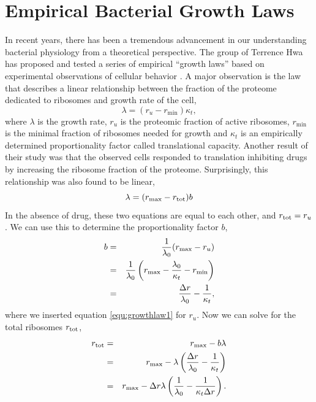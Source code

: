 \section{Empirical Bacterial Growth Laws}
\label{sec:emp_laws}

In recent years, there has been a tremendous advancement in our understanding
bacterial physiology from a theoretical perspective. The group of
Terrence Hwa has proposed and tested a series of empirical ``growth laws'' based on experimental observations of cellular behavior \cite{Scott2010,Deris2013}. A major observation is the law that describes a linear relationship between the fraction of the proteome dedicated to ribosomes and growth rate of the cell,
\begin{equation}
    \lambda = (r_u - r_\mathrm{min})\kappa_t\label{equ:growthlaw1},
\end{equation}
where $\lambda$ is the growth rate, $r_u$ is the proteomic fraction of active ribosomes, $r_\mathrm{min}$ is the minimal fraction of ribosomes needed for growth and $\kappa_t$ is an empirically determined proportionality factor called translational capacity. Another result of their study was that the observed cells responded to translation inhibiting drugs by increasing the ribosome fraction of the proteome. Surprisingly, this relationship was also found to be linear,
\begin{equation}
    \lambda = (r_\mathrm{max} - r_{\mathrm{tot}}) b\label{equ:growthlaw2}
\end{equation}
In the absence of drug, these two equations are equal to each other, and $r_{\mathrm{tot}} = r_u$. We can use this to determine the proportionality factor $b$,
\begin{eqnarray}
    b&=&\frac{1}{\lambda_0}(r_{\mathrm{max}}-r_u) \nonumber\\
    &=&\frac{1}{\lambda_0}\left(r_{\mathrm{max}}-\frac{\lambda_0}{\kappa_t}-r_{\mathrm{min}}\right)\nonumber \\
    &=&\frac{\Delta r}{\lambda_0} - \frac{1}{\kappa_t},
\end{eqnarray}
where we inserted equation \ref{equ:growthlaw1} for $r_u$. Now we can solve for the total ribosomes $r_{\mathrm{tot}}$,
\begin{eqnarray}
    r_{\mathrm{tot}} &=& r_{\mathrm{max}} - b\lambda \nonumber\\
    &=&r_{\mathrm{max}} - \lambda \left(\frac{\Delta r}{\lambda_0} - \frac{1}{\kappa_t}\right) \nonumber\\
    &=& r_{\mathrm{max}} - \Delta r\lambda \left( \frac{1}{\lambda_0} - \frac{1}{\kappa_t\Delta r} \right)\label{equ:rtot}.
\end{eqnarray}


